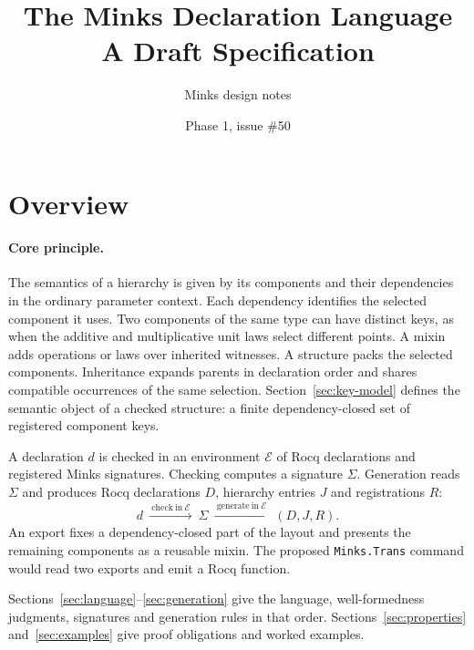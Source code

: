 \documentclass{article}
\title{The Minks Declaration Language\\A Draft Specification}
\author{Minks design notes}
\date{Phase 1, issue \#50}
\newcommand{\ttt}[1]{\texttt{#1}}
\begin{document}
\maketitle

\section{Overview}

\paragraph{Core principle.}
The semantics of a hierarchy is given by its components and their
dependencies in the ordinary parameter context. Each dependency identifies
the selected component it uses. Two components of the same type can have
distinct keys, as when the additive and multiplicative unit laws select
different points. A mixin adds operations or laws over inherited witnesses.
A structure packs the selected components. Inheritance expands parents in
declaration order and shares compatible occurrences of the same selection.
Section~\ref{sec:key-model} defines the semantic object of a checked
structure: a finite dependency-closed set of registered component keys.

A declaration $d$ is checked in an environment $\mathcal E$ of Rocq
declarations and registered Minks signatures. Checking computes a
signature $\Sigma$. Generation reads $\Sigma$ and produces Rocq
declarations $D$, hierarchy entries $J$ and registrations $R$:
\[
  d \ \xrightarrow{\ \mathrm{check\ in}\ \mathcal E\ }\ \Sigma
    \ \xrightarrow{\ \mathrm{generate\ in}\ \mathcal E\ }\ (D,J,R).
\]
An export fixes a dependency-closed part of the layout and presents the
remaining components as a reusable mixin. The proposed
\ttt{Minks.Trans} command would read two exports and emit a Rocq function.

Sections~\ref{sec:language}--\ref{sec:generation} give the language,
well-formedness judgments, signatures and generation rules in that order.
Sections~\ref{sec:properties} and~\ref{sec:examples} give proof obligations
and worked examples.
\end{document}
